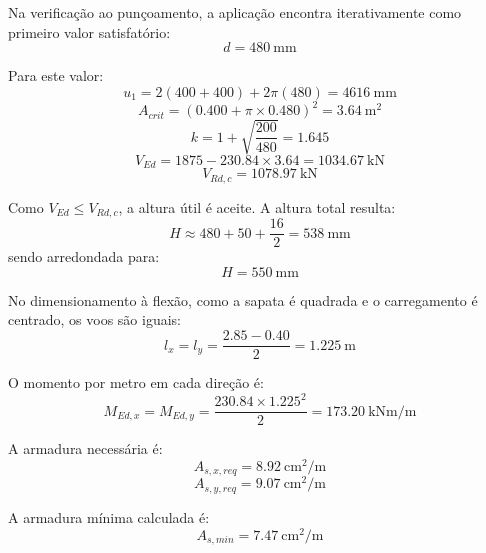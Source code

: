 Na verificação ao punçoamento, a aplicação encontra iterativamente como primeiro valor satisfatório:
\begin{equation}
d=480\ \text{mm}
\end{equation}

Para este valor:
\begin{equation}
u_1 = 2(400+400)+2\pi(480)=4616\ \text{mm}
\end{equation}
\begin{equation}
A_{crit}=(0.400+\pi\times 0.480)^2=3.64\ \text{m}^2
\end{equation}
\begin{equation}
k=1+\sqrt{\frac{200}{480}}=1.645
\end{equation}
\begin{equation}
V_{Ed}=1875 - 230.84\times 3.64=1034.67\ \text{kN}
\end{equation}
\begin{equation}
V_{Rd,c}=1078.97\ \text{kN}
\end{equation}

Como \(V_{Ed}\leq V_{Rd,c}\), a altura útil é aceite. A altura total resulta:
\begin{equation}
H \approx 480+50+\frac{16}{2}=538\ \text{mm}
\end{equation}
sendo arredondada para:
\begin{equation}
H = 550\ \text{mm}
\end{equation}

No dimensionamento à flexão, como a sapata é quadrada e o carregamento é centrado, os voos são iguais:
\begin{equation}
l_x=l_y=\frac{2.85-0.40}{2}=1.225\ \text{m}
\end{equation}

O momento por metro em cada direção é:
\begin{equation}
M_{Ed,x}=M_{Ed,y}=\frac{230.84\times 1.225^2}{2}=173.20\ \text{kNm/m}
\end{equation}

A armadura necessária é:
\begin{equation}
A_{s,x,req}=8.92\ \text{cm}^2/\text{m}
\end{equation}
\begin{equation}
A_{s,y,req}=9.07\ \text{cm}^2/\text{m}
\end{equation}

A armadura mínima calculada é:
\begin{equation}
A_{s,min}=7.47\ \text{cm}^2/\text{m}
\end{equation}

